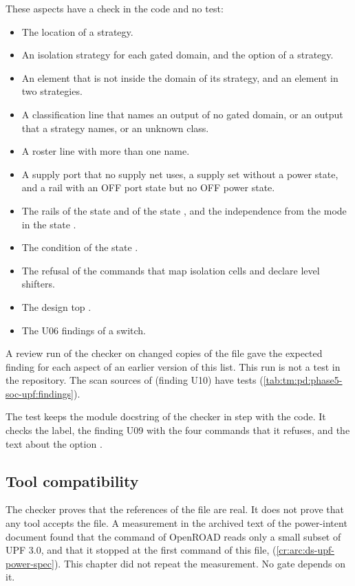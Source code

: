 These aspects have a check in the code and no test:
\begin{itemize}
  \item The location  of a strategy.
  \item An isolation strategy for each gated domain, and the option  of a strategy.
  \item An element that is not inside the domain of its strategy, and an element in two strategies.
  \item A classification line that names an output of no gated domain, or an output that a strategy names, or an unknown class.
  \item A roster line with more than one name.
  \item A supply port that no supply net uses, a supply set without a power state, and a rail with an OFF port state but no OFF power state.
  \item The rails of the state  and of the state , and the independence from the mode in the state .
  \item The condition  of the state .
  \item The refusal of the commands that map isolation cells and declare level shifters.
  \item The design top .
  \item The U06 findings of a switch.
\end{itemize}
A review run of the checker on changed copies of the file gave the expected finding for each aspect of an earlier version of this list. This run is not a test in the repository. The scan sources of  (finding U10) have tests (\cref{tab:tm:pd:phase5-soc-upf:findings}).

The test  keeps the module docstring of the checker in step with the code. It checks the  label, the finding U09 with the four commands that it refuses, and the text about the option .

\subsection{Tool compatibility}
The checker proves that the references of the file are real. It does not prove that any tool accepts the file. A measurement in the archived text of the power-intent document found that the command  of OpenROAD reads only a small subset of UPF 3.0, and that it stopped at the first command of this file,  (\cref{cr:arc:ds-upf-power-spec}). This chapter did not repeat the measurement. No gate depends on it.

